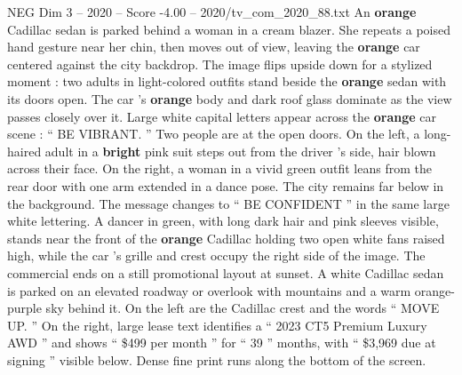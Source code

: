 \begin{textsample}{NEG Dim 3 – 2020 – Score -4.00 – 2020/tv\_com\_2020\_88.txt}
An \textbf{orange} Cadillac sedan is parked behind a woman in a cream blazer.
She repeats a poised hand gesture near her chin, then moves out of view, leaving the \textbf{orange} car centered against the city backdrop.
The image flips upside down for a stylized moment : two adults in light-colored outfits stand beside the \textbf{orange} sedan with its doors open.
The car ’s \textbf{orange} body and dark roof glass dominate as the view passes closely over it.
Large white capital letters appear across the \textbf{orange} car scene : “ BE VIBRANT. ” Two people are at the open doors.
On the left, a long-haired adult in a \textbf{bright} pink suit steps out from the driver ’s side, hair blown across their face.
On the right, a woman in a vivid green outfit leans from the rear door with one arm extended in a dance pose.
The city remains far below in the background.
The message changes to “ BE CONFIDENT ” in the same large white lettering.
A dancer in green, with long dark hair and pink sleeves visible, stands near the front of the \textbf{orange} Cadillac holding two open white fans raised high, while the car ’s grille and crest occupy the right side of the image.
The commercial ends on a still promotional layout at sunset.
A white Cadillac sedan is parked on an elevated roadway or overlook with mountains and a warm orange-purple sky behind it.
On the left are the Cadillac crest and the words “ MOVE UP. ” On the right, large lease text identifies a “ 2023 CT5 Premium Luxury AWD ” and shows “ \$499 per month ” for “ 39 ” months, with “ \$3,969 due at signing ” visible below.
Dense fine print runs along the bottom of the screen.

\end{textsample}
